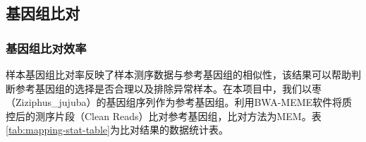 \documentclass[
  a4paper,
  titlepage]{article}
\begin{document}
\hypertarget{ux57faux56e0ux7ec4ux6bd4ux5bf9}{%
\subsection{基因组比对}\label{ux57faux56e0ux7ec4ux6bd4ux5bf9}}

\hypertarget{ux57faux56e0ux7ec4ux6bd4ux5bf9ux6548ux7387}{%
\subsubsection{基因组比对效率}\label{ux57faux56e0ux7ec4ux6bd4ux5bf9ux6548ux7387}}

样本基因组比对率反映了样本测序数据与参考基因组的相似性，该结果可以帮助判断参考基因组的选择是否合理以及排除异常样本。在本项目中，我们以枣（Ziziphus\_jujuba）的基因组序列作为参考基因组。利用BWA-MEME软件将质控后的测序片段（Clean Reads）比对参考基因组，比对方法为MEM。表\ref{tab:mapping-stat-table}为比对结果的数据统计表。
\end{document}
